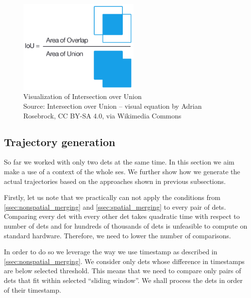 \begin{figure}
    \centering
    \includegraphics[width=6cm]{img/Intersection_over_Union_-_visual_equation.png}
    \caption[Visualization of Intersection over Union]{Visualization of Intersection over Union\\Source: Intersection over Union -- visual equation\protect\footnotemark{} by Adrian Rosebrock, CC BY-SA 4.0,\footnotemark{} via Wikimedia Commons}
    \label{fig:iou}
\end{figure}
\addtocounter{footnote}{-2}


\subsection{Trajectory generation}

\label{ssec:trajectory_generation}

So far we worked with only two \glspl{det} at the same time. In this section we aim make a use of a context of the whole \gls{ses}. We further show how we generate the actual trajectories based on the approaches shown in previous subsections.

Firstly, let us note that we practically can not apply the conditions from \autoref{ssec:nonspatial_merging} and \autoref{ssec:spatial_merging} to every pair of \glspl{det}. Comparing every \gls{det} with every other \gls{det} takes quadratic time with respect to number of \glspl{det} and for hundreds of thousands of \glspl{det} is unfeasible to compute on standard hardware. Therefore, we need to lower the number of comparisons.

In order to do so we leverage the way we use timestamp as described in \autoref{ssec:nonspatial_merging}. We consider only \glspl{det} whose difference in timestamps are below selected threshold. This means that we need to compare only pairs of \glspl{det} that fit within selected ``sliding window''. We shall process the \glspl{det} in order of their timestamp.

